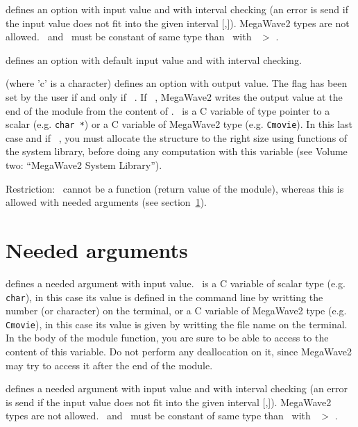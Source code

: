 defines an option with input value and with interval checking 
(an error is send if the input value does not fit into the given interval [\Min,\Max]).
MegaWave2 types are not allowed.
\Min\ and \Max\ must be constant of same type than \Cid\ with \Max\ $>$ \Min.

defines an option with default input value and with interval checking.

(where 'c' is a character) defines an option with output value.
The flag has been set by the user if and only if \Cid\ \DNULL.
If \Cid\ \DNULL, MegaWave2 writes the output value at the end of the module
from the content of \ACid.
\Cid\ is a C variable of type pointer to a scalar (e.g. \verb+char *+)
or a C variable of MegaWave2 type (e.g. \verb+Cmovie+).
In this last case and if \Cid\ \DNULL, you must allocate the
structure to the right size using functions of the system library,
before doing any computation with this variable (see Volume two: ``MegaWave2 System Library'').

Restriction: \Cid\ cannot be a function (return value of the module), 
whereas this is allowed with needed arguments (see section~\ref{header_needed-arg}).


\section{Needed arguments}
\label{header_needed-arg}

\Liste{\Tid\  \Rarrow \Cid} 
defines a needed argument with input value.
\Cid\ is a C variable of scalar type (e.g. \verb+char+),
in this case its value is defined in the command line by writting the
number (or character) on the terminal,
or a C variable of MegaWave2 type (e.g. \verb+Cmovie+),
in this case its value is given by writting the file name on the terminal.
In the body of the module function, you are sure to be able to access
to the content of this variable.
Do not perform any deallocation on it, since MegaWave2 may try to access it
after the end of the module.

\Liste{\Tid\  \Rarrow \Cid [\Min,\Max]} 
defines a needed argument with input value and with interval checking 
(an error is send if the input value does not fit into the given interval [\Min,\Max]).
MegaWave2 types are not allowed.
\Min\ and \Max\ must be constant of same type than \Cid\ with \Max\ $>$ \Min.

